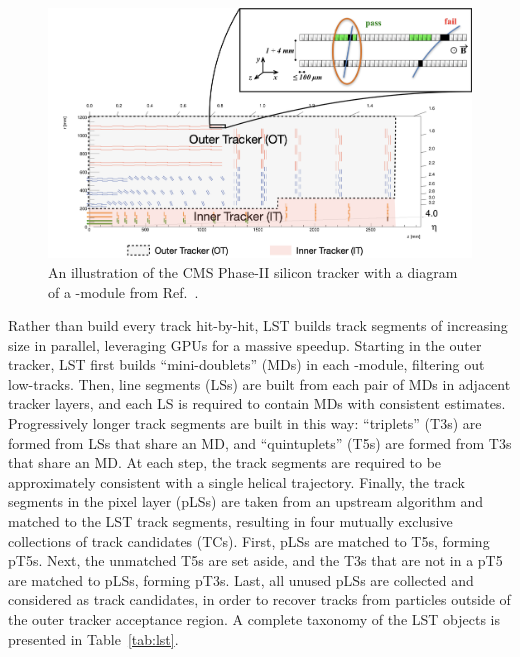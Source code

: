 \begin{figure}[!htb]
    \centering
    \includegraphics[width=0.75\linewidth]{fig/lst/tracker_with_pt_module.png}
    \caption{
        An illustration of the CMS Phase-II silicon tracker with a diagram of a \pt-module from Ref.~\cite{CMS-DP-2023-075}. 
    }
    \label{fig:ph2_tracker}
\end{figure}

Rather than build every track hit-by-hit, LST builds track segments of increasing size in parallel, leveraging GPUs for a massive speedup. 
Starting in the outer tracker, LST first builds ``mini-doublets'' (MDs) in each \pt-module, filtering out low-\pt tracks. 
Then, line segments (LSs) are built from each pair of MDs in  adjacent tracker layers, and each LS is required to contain MDs with consistent \pt estimates. 
Progressively longer track segments are built in this way: ``triplets'' (T3s) are formed from LSs that share an MD, and ``quintuplets'' (T5s) are formed from T3s that share an MD. 
At each step, the track segments are required to be approximately consistent with a single helical trajectory. 
Finally, the track segments in the pixel layer (pLSs) are taken from an upstream algorithm and matched to the LST track segments, resulting in four mutually exclusive collections of track candidates (TCs). 
First, pLSs are matched to T5s, forming pT5s. 
Next, the unmatched T5s are set aside, and the T3s that are not in a pT5 are matched to pLSs, forming pT3s. 
Last, all unused pLSs are collected and considered as track candidates, in order to recover tracks from particles outside of the outer tracker acceptance region. 
A complete taxonomy of the LST objects is presented in Table~\ref{tab:lst}.

